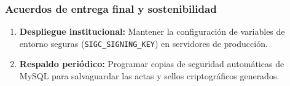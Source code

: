\subsubsection{Acuerdos de entrega final y sostenibilidad}
\begin{enumerate}[nosep]
    \item \textbf{Despliegue institucional:} Mantener la configuración de variables de entorno seguras (\texttt{SIGC\_SIGNING\_KEY}) en servidores de producción.
    \item \textbf{Respaldo periódico:} Programar copias de seguridad automáticas de MySQL para salvaguardar las actas y sellos criptográficos generados.
\end{enumerate}
